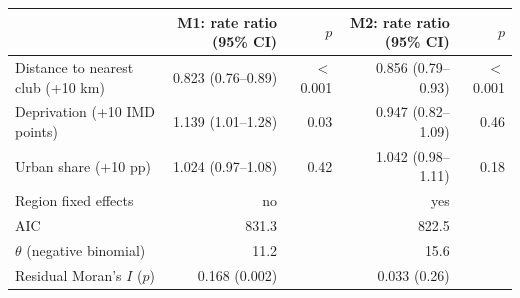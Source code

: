 \begin{tabular}{lrrrr}
\toprule
 & M1: rate ratio (95\% CI) & $p$ & M2: rate ratio (95\% CI) & $p$
\\
\midrule
Distance to nearest club (+10 km) & 0.823 (0.76--0.89) & $<$0.001 & 0.856 (0.79--0.93) & $<$0.001 \\
Deprivation (+10 IMD points) & 1.139 (1.01--1.28) & 0.03 & 0.947 (0.82--1.09) & 0.46 \\
Urban share (+10 pp) & 1.024 (0.97--1.08) & 0.42 & 1.042 (0.98--1.11) & 0.18 \\
Region fixed effects & no &  & yes &  \\
AIC & 831.3 &  & 822.5 &  \\
$\theta$ (negative binomial) & 11.2 &  & 15.6 &  \\
Residual Moran's $I$ ($p$) & 0.168 (0.002) &  & 0.033 (0.26) &  \\
\bottomrule
\end{tabular}
